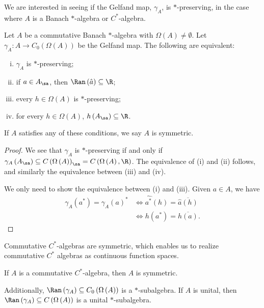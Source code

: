 \documentclass[10pt]{mypackage}
\begin{document}
We are interested in seeing if the Gelfand map, $\gamma_A$, is $\ast$-preserving, in the case where $A$ is a Banach $\ast$-algebra or $C^{\ast}$-algebra.
\begin{proposition}
  Let $A$ be a commutative Banach $\ast$-algebra with $\Omega\left(A\right)\neq \emptyset$. Let $\gamma_A\colon A\rightarrow C_0\left(\Omega\left(A\right)\right)$ be the Gelfand map. The following are equivalent:
  \begin{enumerate}[(i)]
    \item $\gamma_A$ is $\ast$-preserving;
    \item if $a\in A_{\sa}$, then $\Ran\left(\hat{a}\right)\subseteq \R$;
    \item every $h\in \Omega\left(A\right)$ is $\ast$-preserving;
    \item for every $h\in\Omega\left(A\right)$, $h\left(A_{\sa}\right)\subseteq \R$.
  \end{enumerate}
  If $A$ satisfies any of these conditions, we say $A$ is symmetric.
\end{proposition}
\begin{proof}
  We see that $\gamma_A$ is $\ast$-preserving if and only if $\gamma_A\left(A_{\sa}\right)\subseteq C\left(\Omega\left(A\right)\right)_{\sa} = C\left(\Omega\left(A\right),\R\right)$. The equivalence of (i) and (ii) follows, and similarly the equivalence between (iii) and (iv).\newline

  We only need to show the equivalence between (i) and (iii). Given $a\in A$, we have
  \begin{align*}
    \gamma_A\left(a^{\ast}\right) = \gamma_A\left(a\right)^{\ast} &\Leftrightarrow \widehat{a^{\ast}}\left(h\right) = \overline{\hat{a}\left(h\right)}\\
                                                                  &\Leftrightarrow h\left(a^{\ast}\right) = \overline{h\left(a\right)}.
  \end{align*}
\end{proof}
Commutative $C^{\ast}$-algebras are symmetric, which enables us to realize commutative $C^{\ast}$ algebras as continuous function spaces.
\begin{proposition}
  If $A$ is a commutative $C^{\ast}$-algebra, then $A$ is symmetric.\newline

  Additionally, $\Ran\left(\gamma_A\right)\subseteq C_0\left(\Omega\left(A\right)\right)$ is a $\ast$-subalgebra. If $A$ is unital, then $\Ran\left(\gamma_A\right)\subseteq C\left(\Omega\left(A\right)\right)$ is a unital $\ast$-subalgebra.
\end{proposition}
\end{document}
